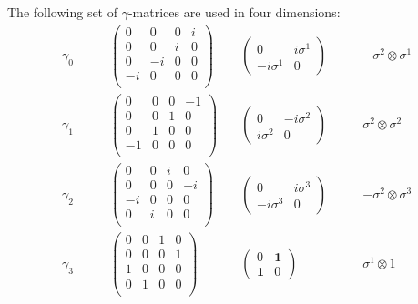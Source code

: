 \documentclass[12pt,letterpaper]{article}
\begin{document}
The following set of $\gamma$-matrices are used in four dimensions:
\[
\begin{array}{lccc}
\gamma_0\quad\quad&
 \left(\begin{array}{rrrr}
   0&0&0&i\\
   0&0&i&0\\
   0&-i&0&0\\
   -i&0&0&0\\
 \end{array}\right)\quad &
 \left(\begin{array}{rr}
   0&i\sigma^1\\
   -i\sigma^1&0
 \end{array}\right)\quad\quad &
 -\sigma^2\!\otimes\!\sigma^1\\
\gamma_1\quad\quad&
 \left(\begin{array}{rrrr}
   0&0&0&-1\\
   0&0&1&0\\
   0&1&0&0\\
   -1&0&0&0\\
 \end{array}\right)\quad &
 \left(\begin{array}{rr}
   0&-i\sigma^2\\
   i\sigma^2&0
 \end{array}\right)\quad\quad &
 \sigma^2\!\otimes\!\sigma^2\\
\gamma_2\quad\quad&
 \left(\begin{array}{rrrr}
   0&0&i&0\\
   0&0&0&-i\\
   -i&0&0&0\\
   0&i&0&0\\
 \end{array}\right)\quad &
 \left(\begin{array}{rr}
   0&i\sigma^3\\
   -i\sigma^3&0
 \end{array}\right)\quad\quad &
 -\sigma^2\!\otimes\!\sigma^3\\
\gamma_3\quad\quad&
 \left(\begin{array}{rrrr}
   0&0&1&0\\
   0&0&0&1\\
   1&0&0&0\\
   0&1&0&0\\
 \end{array}\right)\quad &
 \left(\begin{array}{rr}
   0&\mathbf{1}\\
   \mathbf{1}&0
 \end{array}\right)\quad\quad &
 \sigma^1\!\otimes\!1\\
\end{array}
\]
\end{document}
